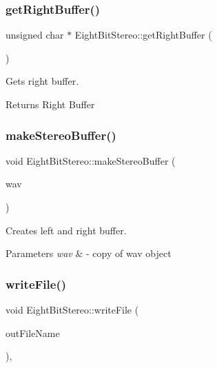 \subsubsection{\texorpdfstring{get\+Right\+Buffer()}{getRightBuffer()}}
{\footnotesize\ttfamily unsigned char $\ast$ Eight\+Bit\+Stereo\+::get\+Right\+Buffer (\begin{DoxyParamCaption}{ }\end{DoxyParamCaption})}

Gets right buffer. \begin{DoxyReturn}{Returns}
Right Buffer 
\end{DoxyReturn}
\mbox{\label{classEightBitStereo_a1026484b3f96f2cee5177fa4157b94c8}} 
\subsubsection{\texorpdfstring{make\+Stereo\+Buffer()}{makeStereoBuffer()}}
{\footnotesize\ttfamily void Eight\+Bit\+Stereo\+::make\+Stereo\+Buffer (\begin{DoxyParamCaption}\item[{const \hyperlink{classWav}{Wav} \&}]{wav }\end{DoxyParamCaption})}

Creates left and right buffer.


\begin{DoxyParams}{Parameters}
{\em wav} & -\/ copy of wav object \\
\hline
\end{DoxyParams}
\mbox{\label{classEightBitStereo_a5eb9c2b69034672b42662c0b50e54d64}} 
\subsubsection{\texorpdfstring{write\+File()}{writeFile()}}
{\footnotesize\ttfamily void Eight\+Bit\+Stereo\+::write\+File (\begin{DoxyParamCaption}\item[{const std\+::string \&}]{out\+File\+Name }\end{DoxyParamCaption})\hspace{0.3cm}{\ttfamily [override]}, {\ttfamily [virtual]}}

